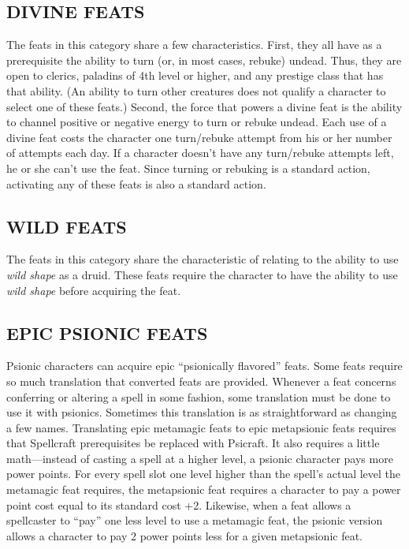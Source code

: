 \documentclass{article}
\begin{document}
\vspace{12pt}
\subsection*{DIVINE FEATS }

The feats in this category share a few characteristics. First, they all have as 
a prerequisite the ability to turn (or, in most cases, rebuke) undead. Thus, they 
are open to clerics, paladins of 4th level or higher, and any prestige class that 
has that ability. (An ability to turn other creatures does not qualify a character 
to select one of these feats.) Second, the force that powers a divine feat is the 
ability to channel positive or negative energy to turn or rebuke undead. Each use 
of a divine feat costs the character one turn/rebuke attempt from his or her number 
of attempts each day. If a character doesn't have any turn/rebuke attempts left, 
he or she can't use the feat. Since turning or rebuking is a standard action, activating 
any of these feats is also a standard action. 

\vspace{12pt}
\subsection*{WILD FEATS }

The feats in this category share the characteristic of relating to the ability 
to use \textit{wild shape }as a druid. These feats require the character to have 
the ability to use \textit{wild shape }before acquiring the feat. 

\vspace{12pt}
\subsection*{EPIC PSIONIC FEATS }

Psionic characters can acquire epic ``psionically flavored'' feats.  Some feats 
require so much translation that converted feats are provided. Whenever a feat 
concerns conferring or altering a spell in some fashion, some translation must 
be done to use it with psionics. Sometimes this translation is as straightforward 
as changing a few names. Translating epic metamagic feats to epic metapsionic feats 
requires that Spellcraft prerequisites be replaced with Psicraft. It also requires 
a little math---instead of casting a spell at a higher level, a psionic character 
pays more power points. For every spell slot one level higher than the spell's 
actual level the metamagic feat requires, the metapsionic feat requires a character 
to pay a power point cost equal to its standard cost +2. Likewise, when a feat 
allows a spellcaster to ``pay'' one less level to use a metamagic feat, the psionic 
version allows a character to pay 2 power points less for a given metapsionic feat. 
\end{document}
